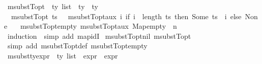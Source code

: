 \begin{isabellebody}
\isanewline
{}\isamarkupfalse%
\ msubstT{\isacharunderscore}{\kern0pt}opt\ {\isacharcolon}{\kern0pt}{\isacharcolon}{\kern0pt}\ {\isachardoublequoteopen}ty\ list\ {\isasymRightarrow}\ ty\ {\isasymRightarrow}\ ty{\isachardoublequoteclose}\isanewline
\ \ \isanewline
\ \ {\isachardoublequoteopen}msubstT{\isacharunderscore}{\kern0pt}opt\ ts\ {\isasymtau}\ {\isacharequal}{\kern0pt}\ msubstT{\isacharunderscore}{\kern0pt}opt{\isacharunderscore}{\kern0pt}aux\ {\isacharparenleft}{\kern0pt}{\isasymlambda}i{\isachardot}{\kern0pt}\ if\ i\ {\isacharless}{\kern0pt}\ length\ ts\ then\ Some\ {\isacharparenleft}{\kern0pt}ts\ {\isacharbang}{\kern0pt}\ i{\isacharparenright}{\kern0pt}\ else\ None{\isacharparenright}{\kern0pt}\ {\isasymtau}\ {}{\isachardoublequoteclose}\isanewline
\isanewline
{}\isamarkupfalse%
\ msubstT{\isacharunderscore}{\kern0pt}opt{\isacharunderscore}{\kern0pt}empty{\isacharcolon}{\kern0pt}\ {\isachardoublequoteopen}msubstT{\isacharunderscore}{\kern0pt}opt{\isacharunderscore}{\kern0pt}aux\ Map{\isachardot}{\kern0pt}empty\ {\isasymtau}\ n\ {\isacharequal}{\kern0pt}\ {\isasymtau}{\isachardoublequoteclose}\isanewline
%
\isadelimproof
\ \ %
\endisadelimproof
%
\isatagproof
{}\isamarkupfalse%
\ {\isacharparenleft}{\kern0pt}induction\ {\isasymtau}{\isacharsemicolon}{\kern0pt}\ simp\ add{\isacharcolon}{\kern0pt}\ map{\isacharunderscore}{\kern0pt}idI{\isacharparenright}{\kern0pt}%
\endisatagproof
{\isafoldproof}%
%
\isadelimproof
\isanewline
%
\endisadelimproof
\isanewline
{}\isamarkupfalse%
\ msubstT{\isacharunderscore}{\kern0pt}opt{\isacharunderscore}{\kern0pt}nil{\isacharcolon}{\kern0pt}\ {\isachardoublequoteopen}msubstT{\isacharunderscore}{\kern0pt}opt\ {\isacharbrackleft}{\kern0pt}{\isacharbrackright}{\kern0pt}\ {\isasymtau}\ {\isacharequal}{\kern0pt}\ {\isasymtau}{\isachardoublequoteclose}\isanewline
%
\isadelimproof
\ \ %
\endisadelimproof
%
\isatagproof
{}\isamarkupfalse%
\ {\isacharparenleft}{\kern0pt}simp\ add{\isacharcolon}{\kern0pt}\ msubstT{\isacharunderscore}{\kern0pt}opt{\isacharunderscore}{\kern0pt}def\ msubstT{\isacharunderscore}{\kern0pt}opt{\isacharunderscore}{\kern0pt}empty{\isacharparenright}{\kern0pt}%
\endisatagproof
{\isafoldproof}%
%
\isadelimproof
\isanewline
%
\endisadelimproof
\isanewline
\isanewline
{}\isamarkupfalse%
\ msubst{\isacharunderscore}{\kern0pt}ty{\isacharunderscore}{\kern0pt}expr\ {\isacharcolon}{\kern0pt}{\isacharcolon}{\kern0pt}\ {\isachardoublequoteopen}ty\ list\ {\isasymRightarrow}\ expr\ {\isasymRightarrow}\ expr{\isachardoublequoteclose}\ \isanewline

\end{isabellebody}
